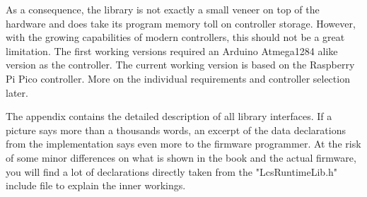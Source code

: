 As a consequence, the library is not exactly a small veneer on top of the hardware and does take its program memory toll on controller storage. However, with the growing capabilities of modern controllers, this should not be a great limitation. The first working versions required an Arduino Atmega1284 alike version as the controller. The current working version is based on the Raspberry Pi Pico controller. More on the individual requirements and controller selection later.

The appendix contains the detailed description of all library interfaces. If a picture says more than a thousands words, an excerpt of the data declarations from the implementation says even more to the firmware programmer. At the risk of some minor differences on what is shown in the book and the actual firmware, you will find a lot of declarations directly taken from the "LcsRuntimeLib.h" include file to explain the inner workings.

